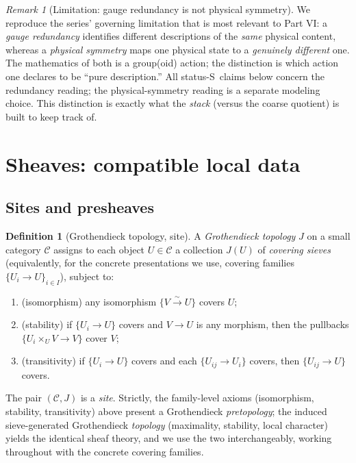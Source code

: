 \documentclass[12pt]{article}
\theoremstyle{definition}
\newtheorem{definition}[theorem]{Definition}
\theoremstyle{remark}
\newtheorem{remark}[theorem]{Remark}
\newcommand{\cat}[1]{\mathcal{#1}}
\newcommand{\Ss}{\textsf{S}}
\begin{document}
\begin{remark}[Limitation: gauge redundancy is not physical symmetry]
\label{rem:limitation-gauge}
We reproduce the series' governing limitation that is most relevant to Part VI: a
\emph{gauge redundancy} identifies different descriptions of the \emph{same} physical
content, whereas a \emph{physical symmetry} maps one physical state to a
\emph{genuinely different} one. The mathematics of both is a group(oid) action; the
distinction is which action one declares to be ``pure description.'' All status-\Ss\
claims below concern the redundancy reading; the physical-symmetry reading is a
separate modeling choice. This distinction is exactly what the \emph{stack} (versus the
coarse quotient) is built to keep track of.
\end{remark}

\section{Sheaves: compatible local data}
\label{sec:sheaves}

\subsection{Sites and presheaves}

\begin{definition}[Grothendieck topology, site]
\label{def:site}
A \emph{Grothendieck topology} $J$ on a small category $\cat C$ assigns to each object
$U\in\cat C$ a collection $J(U)$ of \emph{covering sieves} (equivalently, for the
concrete presentations we use, covering families $\{U_i\to U\}_{i\in I}$), subject to:
\begin{enumerate}
\item (isomorphism) any isomorphism $\{V\xrightarrow{\sim}U\}$ covers $U$;
\item (stability) if $\{U_i\to U\}$ covers and $V\to U$ is any morphism, then the
pullbacks $\{U_i\times_U V\to V\}$ cover $V$;
\item (transitivity) if $\{U_i\to U\}$ covers and each $\{U_{ij}\to U_i\}$ covers, then
$\{U_{ij}\to U\}$ covers.
\end{enumerate}
The pair $(\cat C, J)$ is a \emph{site}. Strictly, the family-level axioms
(isomorphism, stability, transitivity) above present a Grothendieck
\emph{pretopology}; the induced sieve-generated Grothendieck \emph{topology}
(maximality, stability, local character) yields the identical sheaf theory, and we use
the two interchangeably, working throughout with the concrete covering families.
\end{definition}
\end{document}
